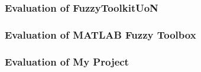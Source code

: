 \subsubsection{Evaluation of FuzzyToolkitUoN}


\subsubsection{Evaluation of MATLAB Fuzzy Toolbox} 	

\subsubsection{Evaluation of My Project}	

